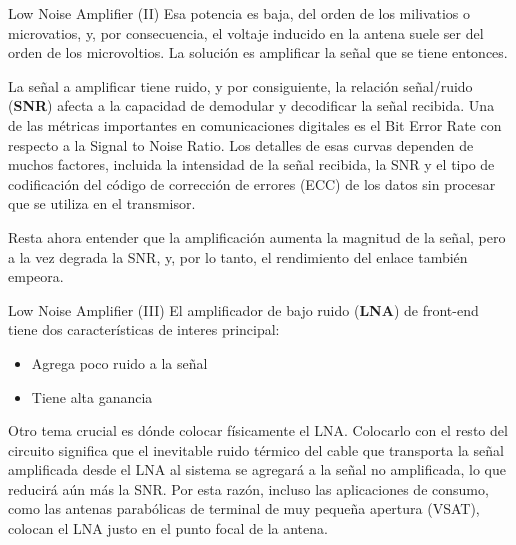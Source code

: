 \documentclass[9pt]{beamer}
\begin{document}
	\begin{frame}{Low Noise Amplifier (II)}
		Esa potencia es baja, del orden de los milivatios o microvatios, y, por consecuencia, el voltaje inducido en la antena suele ser del orden de los microvoltios. La solución es amplificar la señal que se tiene entonces. 
		
		La señal a amplificar tiene ruido, y por consiguiente, la relación señal/ruido (\textbf{SNR}) afecta a la capacidad de demodular y decodificar la señal recibida. Una de las métricas importantes en comunicaciones digitales es el Bit Error Rate con respecto a la Signal to Noise Ratio. Los detalles de esas curvas dependen de muchos factores, incluida la intensidad de la señal recibida, la SNR y el tipo de codificación del código de corrección de errores (ECC) de los datos sin procesar que se utiliza en el transmisor.
		
		Resta ahora entender que la amplificación aumenta la magnitud de la señal, pero a la vez degrada la SNR, y, por lo tanto, el rendimiento del enlace también empeora. 
	\end{frame}
	
	\begin{frame}{Low Noise Amplifier (III)}
		El amplificador de bajo ruido (\textbf{LNA}) de front-end tiene dos características de interes principal:
		\begin{itemize}
			\item Agrega poco ruido a la señal
			\item Tiene alta ganancia
		\end{itemize}
		
		Otro tema crucial es dónde colocar físicamente el LNA. Colocarlo con el resto del circuito significa que el inevitable ruido térmico del cable que transporta la señal amplificada desde el LNA al sistema se agregará a la señal no amplificada, lo que reducirá aún más la SNR. Por esta razón, incluso las aplicaciones de consumo, como las antenas parabólicas de terminal de muy pequeña apertura (VSAT), colocan el LNA justo en el punto focal de la antena.
	\end{frame}	
	
\end{document}

